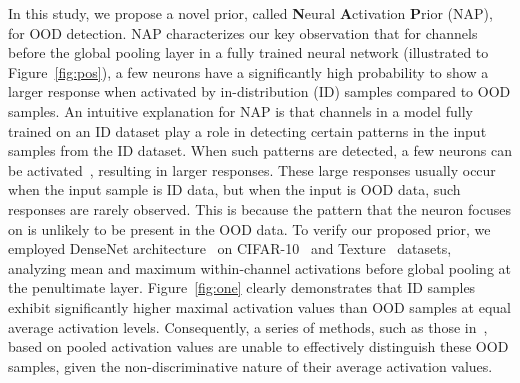 In this study, we propose a novel prior, called \textbf{N}eural \textbf{A}ctivation \textbf{P}rior (NAP), for OOD detection. NAP characterizes our key observation that for channels before the global pooling layer in a fully trained neural network (illustrated to Figure~\ref{fig:pos}), a few neurons have a   significantly high probability to show 
a larger response when activated by in-distribution (ID) samples compared to OOD samples. An intuitive explanation for NAP is that channels in a model fully trained on an ID dataset play a role in detecting certain patterns in the input samples from the ID dataset. 
When such patterns are detected, a few neurons can be activated~\cite{hoefler2021sparsity}, resulting in larger responses. These large responses usually occur when the input sample is ID data, but when the input is OOD data, such responses are rarely observed. This is because the pattern that the neuron focuses on is unlikely to be present in the OOD data.
To verify our proposed prior, we employed DenseNet architecture~\cite{huang2017densely} on CIFAR-10~\cite{krizhevsky2009cifar} and Texture~\cite{cimpoi2014texture} datasets, analyzing mean and maximum within-channel activations before global pooling at the penultimate layer. Figure~\ref{fig:one} clearly demonstrates that ID samples exhibit significantly higher maximal activation values than OOD samples at equal average activation levels. Consequently, a series of methods, such as those in~\cite{hendrycks2016msp,sun2022knn,liu2020energy,liang2018odin_confi,lee2018maha_dist,sun2022dice,djurisic2022extremely,ahn2023line,sun2021react}, based on pooled activation values are unable to effectively distinguish these OOD samples, given the non-discriminative nature of their average activation values.

